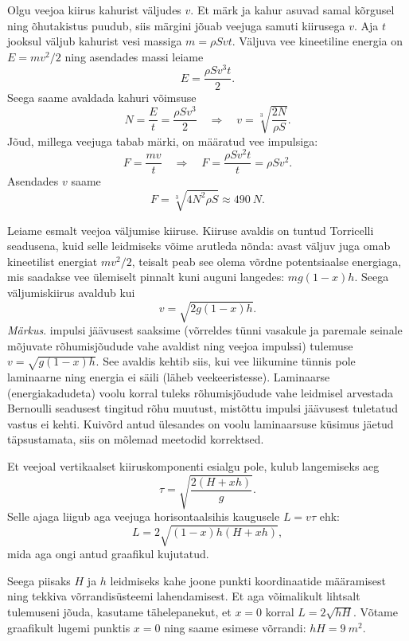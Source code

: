 \documentclass[10pt]{article}
\begin{document}
{%

\solu
Olgu veejoa kiirus kahurist väljudes $v$. Et märk ja kahur asuvad samal kõrgusel ning õhutakistus puudub, siis märgini jõuab veejuga samuti kiirusega $v$. Aja $t$ jooksul väljub kahurist vesi massiga $m = \rho Svt$. Väljuva vee kineetiline energia on $E = mv^2/2$ ning asendades massi leiame
\[
E = \frac{\rho Sv^3t}{2}.
\]
Seega saame avaldada kahuri võimsuse
\[
N=\frac{E}{t}=\frac{\rho S v^{3}}{2} \quad \Rightarrow \quad v=\sqrt[3]{\frac{2 N}{\rho S}}.
\]
Jõud, millega veejuga tabab märki, on määratud vee impulsiga:
\[
F=\frac{m v}{t} \quad \Rightarrow \quad F=\frac{\rho S v^{2} t}{t}=\rho S v^{2}.
\]
Asendades $v$ saame
\[
F=\sqrt[3]{4 N^{2} \rho S} \approx \SI{490}{N}.
\]
\probend
\bigskip


\solu
Leiame esmalt veejoa väljumise kiiruse. Kiiruse avaldis on tuntud Torricelli seadusena, kuid selle leidmiseks võime arutleda nõnda: avast väljuv juga omab kineetilist energiat $mv^2/2$, teisalt peab see olema võrdne potentsiaalse energiaga, mis saadakse vee ülemiselt pinnalt kuni auguni langedes: $mg(1 - x)h$. Seega väljumiskiirus avaldub kui
\[
v = \sqrt{2g(1 - x)h}.
\]
\emph{Märkus}. impulsi jäävusest saaksime (võrreldes tünni vasakule ja paremale seinale mõjuvate rõhumisjõudude vahe avaldist ning veejoa impulssi) tulemuse $v = \sqrt{g(1 - x)h}$. See avaldis kehtib siis, kui vee liikumine tünnis pole laminaarne ning energia ei säili (läheb veekeeristesse). Laminaarse (energiakadudeta) voolu korral tuleks rõhumisjõudude vahe leidmisel arvestada Bernoulli seadusest tingitud rõhu muutust, mistõttu impulsi jäävusest tuletatud vastus ei kehti. Kuivõrd antud ülesandes on voolu laminaarsuse küsimus jäetud täpsustamata, siis on mõlemad meetodid korrektsed.

Et veejoal vertikaalset kiiruskomponenti esialgu pole, kulub langemiseks aeg
\[
\tau = \sqrt{\frac{2(H+xh)}{g}}.
\]
Selle ajaga liigub aga veejuga horisontaalsihis kaugusele $L = v\tau$ ehk:
\[
L=2 \sqrt{(1-x) h(H+x h)},
\]
mida aga ongi antud graafikul kujutatud.

Seega piisaks $H$ ja $h$ leidmiseks kahe joone punkti koordinaatide määramisest ning tekkiva võrrandisüsteemi lahendamisest. Et aga võimalikult lihtsalt tulemuseni jõuda, kasutame tähelepanekut, et $x = 0$ korral $L = 2\sqrt{hH}$. Võtame graafikult lugemi punktis $x = 0$ ning saame esimese võrrandi: $hH = \SI{9}{m^2}$.

}
\end{document}
